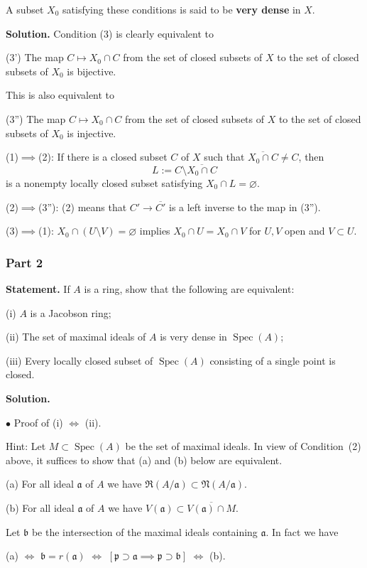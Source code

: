 \documentclass[parskip=half,fontsize=12pt]{scrartcl}%
\newcommand{\mf}{\mathfrak}
\newcommand{\aaa}{\mf a}
\newcommand{\bbb}{\mf b}
\newcommand{\ppp}{\mf p}
\newcommand{\bu}{\bullet}
\newcommand{\Spec}{\operatorname{Spec}}\newcommand{\Sp}{\operatorname{Spec}}
\begin{document}
A subset $X_0$ satisfying these conditions is said to be \textbf{very dense} in $X$. 

\textbf{Solution.} Condition (3) is clearly equivalent to 

(3') The map $C\mapsto X_0\cap C$ from the set of closed subsets of $X$ to the set of closed subsets of $X_0$ is bijective.

This is also equivalent to 

(3'') The map $C\mapsto X_0\cap C$ from the set of closed subsets of $X$ to the set of closed subsets of $X_0$ is injective.

(1)$\implies$(2): If there is a closed subset $C$ of $X$ such that $\overline{X_0\cap C}\ne C$, then 
$$
L:=C\setminus\overline{X_0\cap C}
$$ 
is  a nonempty locally closed subset satisfying $X_0\cap L=\varnothing$. 

(2)$\implies$(3''): (2) means that $C'\to\overline{C'}$ is a left inverse to the map in (3''). 

(3)$\implies$(1): $X_0\cap(U\setminus V)=\varnothing$ implies $X_0\cap U=X_0\cap V$ for $U,V$ open and $V\subset U$.

\subsubsection{Part 2} 

\textbf{Statement.} If $A$ is a ring, show that the following are equivalent:

(i) $A$ is a Jacobson ring;

(ii) The set of maximal ideals of $A$ is very dense in $\Spec(A)$;

(iii) Every locally closed subset of $\Spec(A)$ consisting of a single point is closed.

\textbf{Solution.} 

$\bu$ Proof of (i) $\iff$ (ii). 

Hint: Let $M\subset\Spec(A)$ be the set of maximal ideals. In view of Condition~(2) above, it suffices to show that (a) and (b) below are equivalent.

(a) For all ideal $\aaa$ of $A$ we have $\mf R(A/\aaa)\subset\mf N(A/\aaa)$.

(b) For all ideal $\aaa$ of $A$ we have $V(\aaa)\subset\overline{V(\aaa)\cap M}$.

Let $\bbb$ be the intersection of the maximal ideals containing $\aaa$. In fact we have\medskip 

\centerline{(a) $\iff$ $\bbb=r(\aaa)$ $\iff$ $[\ppp\supset\aaa\implies\ppp\supset\bbb]$ $\iff$ (b).}
\end{document}
